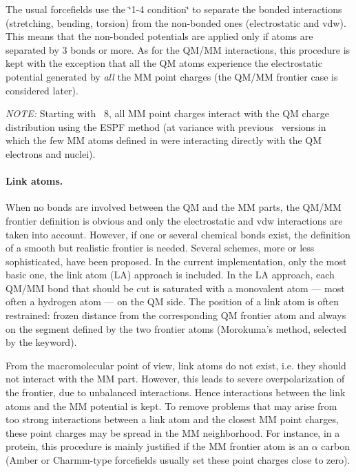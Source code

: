 The usual forcefields use the \char`\"{}1-4 condition\char`\"{} to separate the bonded interactions (stretching, bending, torsion) from the non-bonded ones (electrostatic and vdw). This means that the non-bonded potentials are applied only if atoms are separated by 3 bonds or more. As for the QM/MM interactions, this procedure is kept with the exception that all the QM atoms experience the electrostatic potential generated by \emph{all} the MM point charges (the QM/MM frontier case is considered later).

\emph{NOTE:} Starting with \molcas\ 8, all MM point charges interact with the QM charge distribution using the ESPF method (at variance with previous \molcas\ versions in which the few MM atoms defined in  were interacting directly with the QM electrons and nuclei).

\paragraph{Link atoms.}
When no bonds are involved between the QM and the MM parts, the QM/MM frontier definition is obvious and only the electrostatic and vdw interactions are taken into account. However, if one or several chemical bonds exist, the definition of a smooth but realistic frontier is needed. Several schemes, more or less sophisticated, have been proposed. In the current implementation, only the most basic one, the link atom (LA) approach is included. In the LA approach, each QM/MM bond that should be cut is saturated with a monovalent atom --- most often a hydrogen atom --- on the QM side. The position of a link atom is often restrained: frozen distance from the corresponding QM frontier atom and always on the segment defined by the two frontier atoms (Morokuma's method, selected by the  keyword).

From the macromolecular point of view, link atoms do not exist, i.e. they should not interact with the MM part. However, this leads to severe overpolarization of the frontier, due to unbalanced interactions. Hence interactions between the link atoms and the MM potential is kept. To remove problems that may arise from too strong interactions between a link atom and the closest MM point charges, these point charges may be spread in the MM neighborhood. For instance, in a protein, this procedure is mainly justified if the MM frontier atom is an $\alpha$ carbon (Amber or Charmm-type forcefields usually set these point charges close to zero).

